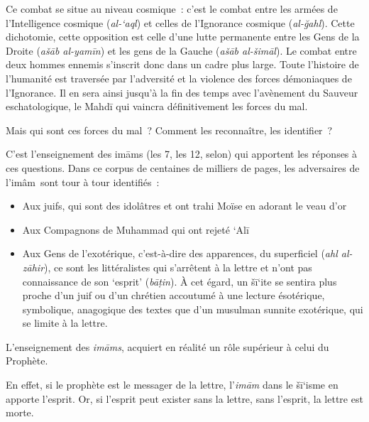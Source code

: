 Ce combat se situe au niveau cosmique~: c'est le combat entre les armées
de l'Intelligence cosmique (\emph{al-`aql}) et celles de l'Ignorance
cosmique (\emph{al-ğahl}). Cette dichotomie, cette opposition est celle
d'une lutte permanente entre les Gens de la Droite (\emph{ašāb
al-yamīn}) et les gens de la Gauche (\emph{ašāb al-šimāl}). Le combat
entre deux hommes ennemis s'inscrit donc dans un cadre plus large. Toute
l'histoire de l'humanité est traversée par l'adversité et la violence
des forces démoniaques de l'Ignorance. Il en sera ainsi jusqu'à la fin
des temps avec l'avènement du Sauveur eschatologique, le Mahdī qui
vaincra définitivement les forces du mal.

Mais qui sont ces forces du mal~? Comment les reconnaître, les
identifier~?

C'est l'enseignement des imāms (les 7, les 12, selon) qui apportent les
réponses à ces questions. Dans ce corpus de centaines de milliers de
pages, les adversaires de l'imâm~sont tour à tour identifiés~:

\begin{itemize}
\item
  Aux juifs, qui sont des idolâtres et ont trahi Moïse en adorant le
  veau d'or
\item
  Aux Compagnons de Muhammad qui ont rejeté `Alī
\item
  Aux Gens de l'exotérique, c'est-à-dire des apparences, du superficiel
  (\emph{ahl al-zāhir}), ce sont les littéralistes qui s'arrêtent à la
  lettre et n'ont pas connaissance de son `esprit' (\emph{bāṭin}). À cet
  égard, un šī`ite se sentira plus proche d'un juif ou d'un chrétien
  accoutumé à une lecture ésotérique, symbolique, anagogique des textes
  que d'un musulman sunnite exotérique, qui se limite à la lettre.
\end{itemize}


L'enseignement des \emph{imāms}, acquiert en réalité un rôle supérieur à
celui du Prophète.

En effet, si le prophète est le messager de la lettre, l'\emph{imām}
dans le šī`isme en apporte l'esprit. Or, si l'esprit peut exister sans
la lettre, sans l'esprit, la lettre est morte.


